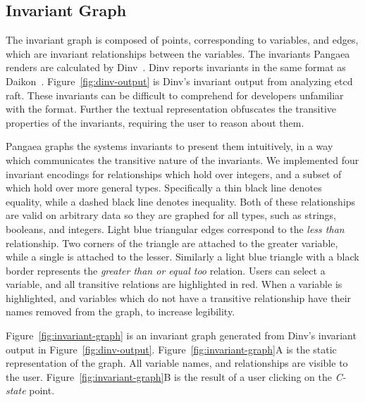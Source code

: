 \subsection{Invariant Graph}
\label{sec:invariant-graph}

The invariant graph is composed of points, corresponding to variables,
and edges, which are invariant relationships between the variables.
The invariants Pangaea renders are calculated by Dinv~\cite{dinv}.
Dinv reports invariants in the same format as Daikon~\cite{Ernst01}.
Figure~\ref{fig:dinv-output} is Dinv's invariant output from analyzing
etcd raft. These invariants can be difficult to comprehend for
developers unfamiliar with the format. Further the textual representation
obfuscates the transitive properties of the invariants, requiring the
user to reason about them.

Pangaea graphs the systems invariants to present them intuitively, in a
way which communicates the transitive nature of the invariants. We
implemented four invariant encodings for relationships which hold over
integers, and a subset of which hold over more general types.
Specifically a thin black line denotes equality, while a dashed black
line denotes inequality. Both of these relationships are valid on
arbitrary data so they are graphed for all types, such as strings,
booleans, and integers. Light blue triangular edges correspond to the
\emph{less than} relationship. Two corners of the triangle are attached
to the greater variable, while a single is attached to the lesser.
Similarly a light blue triangle with a black border represents the
\emph{greater than or equal too} relation. Users can select a
variable, and all transitive relations are highlighted in red. When a
variable is highlighted, and variables which do not have a transitive
relationship have their names removed from the graph, to increase
legibility.

Figure~\ref{fig:invariant-graph} is an invariant graph generated from
Dinv's invariant output in Figure~\ref{fig:dinv-output}.
Figure~\ref{fig:invariant-graph}A is the static representation of the
graph.  All variable names, and relationships are visible to the
user. Figure~\ref{fig:invariant-graph}B is the result of a user clicking
on the \emph{C-state} point.

